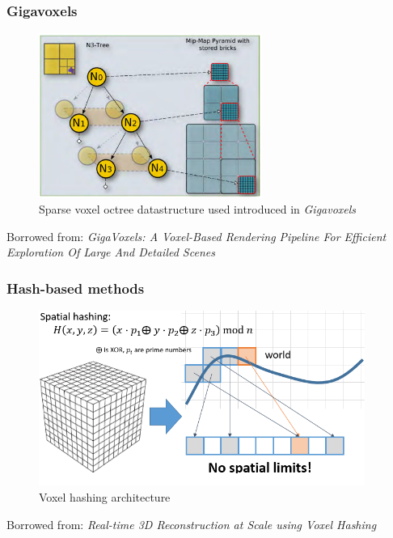 \documentclass[handout]{beamer}
\begin{document}
\begin{frame}
  \frametitle{Gigavoxels}
  \begin{figure}
    \centering
    \includegraphics[width=0.65\textwidth]{figures/gigavoxels-tree.png}
    \caption{Sparse voxel octree datastructure used introduced in \textit{Gigavoxels}}
    \label{fig:gigavoxels-datastructure}
  \end{figure}
  \scriptsize Borrowed from: \textit{GigaVoxels: A Voxel-Based Rendering Pipeline For Efficient Exploration Of Large And Detailed Scenes}
\end{frame}
\begin{frame}
  \frametitle{Hash-based methods}
  \begin{figure}
    \centering
    \includegraphics[width=0.95\textwidth]{figures/voxel-hashing.png}
    \caption{Voxel hashing architecture}
    \label{fig:voxel-hashing}
  \end{figure}
  \scriptsize Borrowed from: \textit{Real-time 3D Reconstruction at Scale using Voxel Hashing}
\end{frame}
\end{document}
